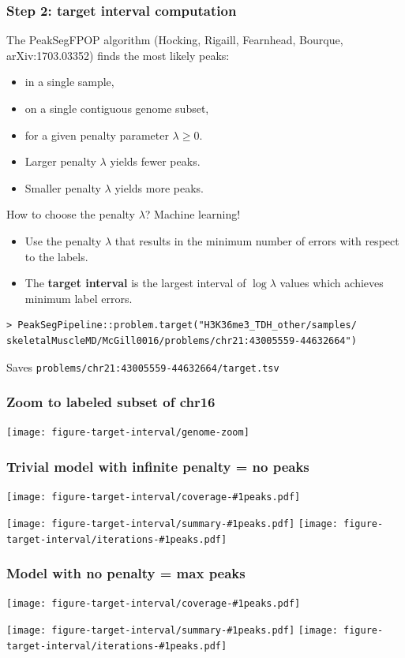 \documentclass{beamer}
\begin{document}
\begin{frame}[fragile]
  \frametitle{Step 2: target interval computation}
  The PeakSegFPOP algorithm (Hocking, Rigaill, Fearnhead, Bourque,
  arXiv:1703.03352) finds the most likely peaks:
  \begin{itemize}
  \item in a single sample, 
  \item on a single contiguous genome subset,
  \item for a given penalty parameter $\lambda\geq 0$.
  \item Larger penalty $\lambda$ yields fewer peaks.
  \item Smaller penalty $\lambda$ yields more peaks.
  \end{itemize}
  How to choose the penalty $\lambda$? Machine learning!
  \begin{itemize}
  \item Use the penalty $\lambda$ that results in the minimum
    number of errors with respect to the labels.
  \item The \textbf{target interval} is the largest interval of
    $\log\lambda$ values which achieves minimum label errors.
  \end{itemize}
\small
\begin{verbatim}
> PeakSegPipeline::problem.target("H3K36me3_TDH_other/samples/
skeletalMuscleMD/McGill0016/problems/chr21:43005559-44632664")
\end{verbatim}
Saves \verb|problems/chr21:43005559-44632664/target.tsv|
\end{frame}

\begin{frame}
  \frametitle{Zoom to labeled subset of chr16}
  \texttt{[image: figure-target-interval/genome-zoom]} 
\end{frame}

\newcommand{\showboth}[1]{
  \texttt{[image: figure-target-interval/coverage-\#1peaks.pdf]}

  \texttt{[image: figure-target-interval/summary-\#1peaks.pdf]}
  \texttt{[image: figure-target-interval/iterations-\#1peaks.pdf]}
} 

\begin{frame}
  \frametitle{Trivial model with infinite penalty = no peaks}
  \showboth{0}
\end{frame}

\begin{frame}
  \frametitle{Model with no penalty = max peaks}
  \showboth{711188}%
\end{frame}
\end{document}
